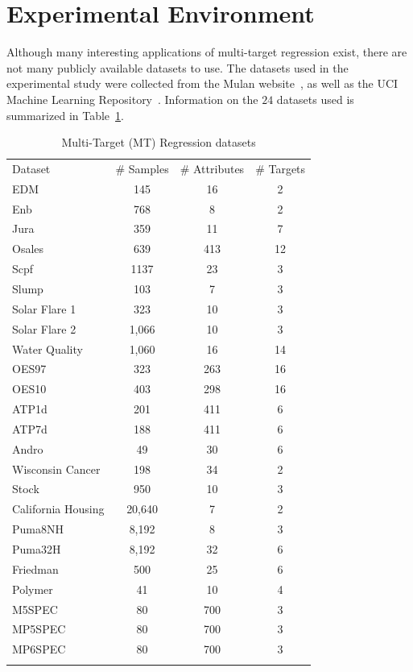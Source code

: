 \documentclass[reqno]{vcuthesis}
\numberwithin{equation}{chapter}
\begin{document}
\section{Experimental Environment}\label{sec:MTRexperiments}
Although many interesting applications of multi-target regression exist, there are not many publicly available datasets to use. The datasets used in the experimental study were collected from the Mulan website~\cite{mulan}, as well as the UCI Machine Learning Repository~\cite{Lichman:2013}. Information on the $24$ datasets used is summarized in Table~\ref{tab:mtrdatasets}.
\begin{table}[b!]
\centering \small
\caption{Multi-Target (MT) Regression datasets} \label{tab:mtrdatasets}
\begin{tabular}{lccc}
\noalign{\smallskip}\hline\noalign{\smallskip}
Dataset & \# Samples & \# Attributes & \# Targets \\
\noalign{\smallskip}\hline\noalign{\smallskip}
EDM & 145 & 16 & 2\\
Enb & 768 & 8 & 2 \\
Jura & 359 & 11 & 7 \\
Osales & 639 & 413 & 12 \\
Scpf & 1137 & 23 & 3 \\
Slump & 103 & 7 & 3 \\
Solar Flare 1 & 323 & 10 & 3\\
Solar Flare 2 & 1,066 & 10 & 3\\
Water Quality & 1,060 & 16 & 14\\
OES97 & 323 & 263 & 16\\
OES10 & 403 & 298 & 16\\
ATP1d & 201 & 411 & 6\\
ATP7d & 188 & 411 & 6\\
Andro & 49 & 30 & 6 \\
Wisconsin Cancer & 198 & 34 & 2\\
Stock & 950 & 10 & 3\\
California Housing & 20,640 & 7 & 2\\
Puma8NH & 8,192 & 8 & 3\\
Puma32H & 8,192 & 32 & 6\\
Friedman & 500 & 25 & 6\\
Polymer & 41 & 10 & 4\\
M5SPEC & 80 & 700 & 3\\
MP5SPEC & 80 & 700 & 3\\
MP6SPEC & 80 & 700 & 3\\
\noalign{\smallskip}\hline\noalign{\smallskip}
\end{tabular}
\end{table}
\end{document}
